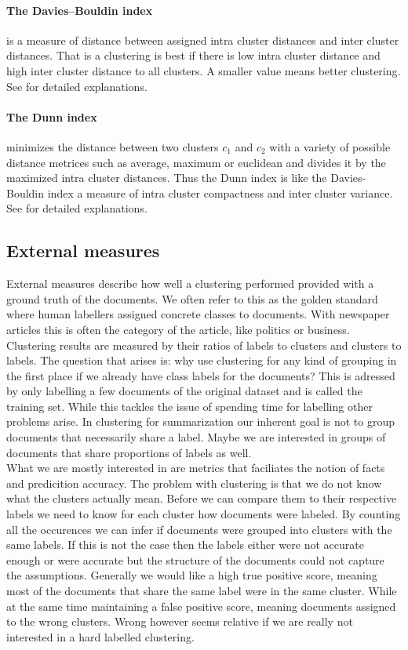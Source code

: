     \paragraph{The Davies–Bouldin index} is a measure of distance between assigned intra cluster distances and inter cluster distances. That is a clustering is best if there is low intra cluster distance and high inter cluster distance to all clusters. A smaller value means better clustering. See \cite{DavisBouldin1979} for detailed explanations.

    \paragraph{The Dunn index} minimizes the distance between two clusters $c_1$ and $c_2$ with a variety of possible distance metrices such as average, maximum or euclidean and divides it by the maximized intra cluster distances. Thus the Dunn index is like the Davies-Bouldin index a measure of intra cluster compactness and inter cluster variance. See \cite{DunnIndex1973} for detailed explanations. 

  \subsection{External measures}
  \label{sec:external_measures}

    External measures describe how well a clustering performed provided with a ground truth of the documents. We often refer to this as the golden standard where human labellers assigned concrete classes to documents. With newspaper articles this is often the category of the article, like politics or business. Clustering results are measured by their ratios of labels to clusters and clusters to labels. The question that arises is: why use clustering for any kind of grouping in the first place if we already have class labels for the documents? This is adressed by only labelling a few documents of the original dataset and is called the training set. While this tackles the issue of spending time for labelling other problems arise. In clustering for summarization our inherent goal is not to group documents that necessarily share a label. Maybe we are interested in groups of documents that share proportions of labels as well.\\
    What we are mostly interested in are metrics that faciliates the notion of facts and predicition accuracy. The problem with clustering is that we do not know what the clusters actually mean. Before we can compare them to their respective labels we need to know for each cluster how documents were labeled. By counting all the occurences we can infer if documents were grouped into clusters with the same labels. If this is not the case then the labels either were not accurate enough or were accurate but the structure of the documents could not capture the assumptions. Generally we would like a high true positive score, meaning most of the documents that share the same label were in the same cluster. While at the same time maintaining a false positive score, meaning documents assigned to the wrong clusters. Wrong however seems relative if we are really not interested in a hard labelled clustering.

